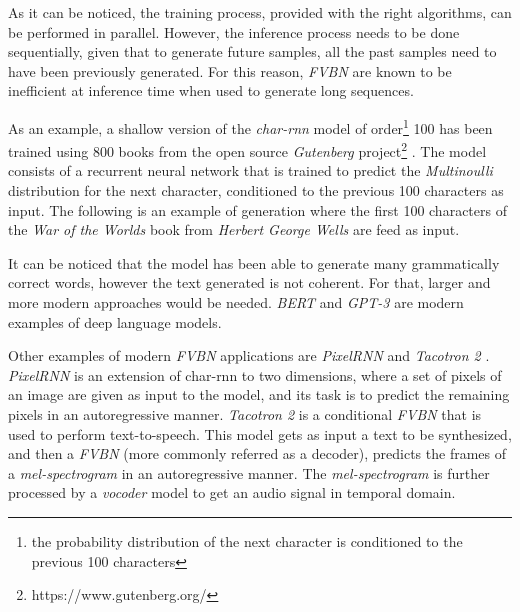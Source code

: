 As it can be noticed, the training process, provided with the right algorithms, can be performed in parallel. However, the inference process needs to be done sequentially, given that to generate future samples, all the past samples need to have been previously generated. For this reason, \textit{FVBN} are known to be inefficient at inference time when used to generate long sequences.

As an example, a shallow version of the \textit{char-rnn} model of order\footnote{the probability distribution of the next character is conditioned to the previous 100 characters} 100 has been trained using 800 books from the open source \textit{Gutenberg} project\footnote{https://www.gutenberg.org/} \cite{gerlach2020}. The model consists of a recurrent neural network that is trained to predict the \textit{Multinoulli} distribution for the next character, conditioned to the previous 100 characters as input. The following is an example of generation where the first 100 characters of the \textit{War of the Worlds} book from \textit{Herbert George Wells} are feed as input.


It can be noticed that the model has been able to generate many grammatically correct words, however the text generated is not coherent. For that, larger and more modern approaches would be needed. \textit{BERT} \cite{davlin2019} and \textit{GPT-3} \cite{floridi2020} are modern examples of deep language models.

Other examples of modern \textit{FVBN} applications are \textit{PixelRNN} and \textit{Tacotron 2} \cite{Wang2017,Shen2018,Liu2019}. \textit{PixelRNN} \cite{Oord2016, Oord2016b} is an extension of char-rnn to two dimensions, where a set of pixels of an image are given as input to the model, and its task is to predict the remaining pixels in an autoregressive manner. \textit{Tacotron 2} is a conditional \textit{FVBN} that is used to perform text-to-speech. This model gets as input a text to be synthesized, and then a \textit{FVBN} (more commonly referred as a decoder), predicts the frames of a \textit{mel-spectrogram} in an autoregressive manner. The \textit{mel-spectrogram} is further processed by a \textit{vocoder} model \cite{vanderoord2016, lorenzotrueba2019a} to get an audio signal in temporal domain.

